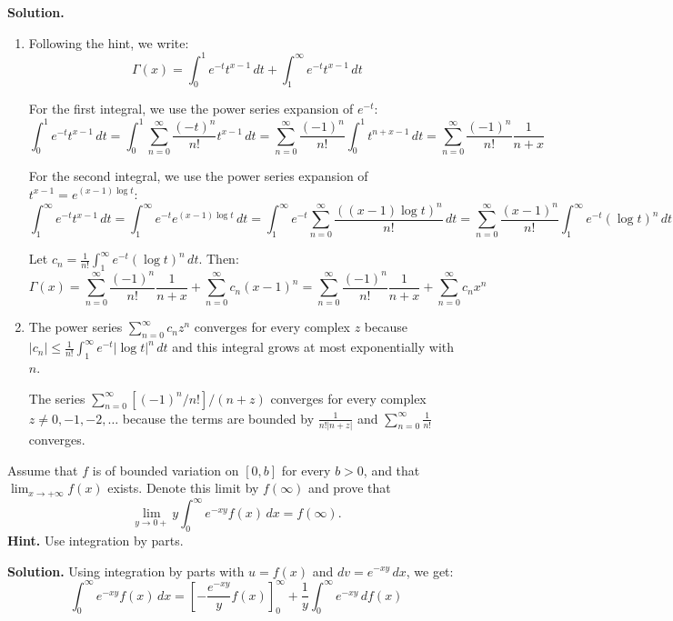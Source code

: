 \noindent\textbf{Solution.}
\begin{enumerate}[label=(\alph*)]
    \item Following the hint, we write:
    \[\Gamma(x) = \int_0^1 e^{-t} t^{x-1} \, dt + \int_1^\infty e^{-t} t^{x-1} \, dt\]
    
    For the first integral, we use the power series expansion of $e^{-t}$:
    \[\int_0^1 e^{-t} t^{x-1} \, dt = \int_0^1 \sum_{n=0}^{\infty} \frac{(-t)^n}{n!} t^{x-1} \, dt = \sum_{n=0}^{\infty} \frac{(-1)^n}{n!} \int_0^1 t^{n+x-1} \, dt = \sum_{n=0}^{\infty} \frac{(-1)^n}{n!} \frac{1}{n + x}\]
    
    For the second integral, we use the power series expansion of $t^{x-1} = e^{(x-1)\log t}$:
    \[\int_1^\infty e^{-t} t^{x-1} \, dt = \int_1^\infty e^{-t} e^{(x-1)\log t} \, dt = \int_1^\infty e^{-t} \sum_{n=0}^{\infty} \frac{((x-1)\log t)^n}{n!} \, dt = \sum_{n=0}^{\infty} \frac{(x-1)^n}{n!} \int_1^\infty e^{-t} (\log t)^n \, dt\]
    
    Let $c_n = \frac{1}{n!} \int_1^\infty e^{-t} (\log t)^n \, dt$. Then:
    \[\Gamma(x) = \sum_{n=0}^{\infty} \frac{(-1)^n}{n!} \frac{1}{n + x} + \sum_{n=0}^{\infty} c_n (x-1)^n = \sum_{n=0}^{\infty} \frac{(-1)^n}{n!} \frac{1}{n + x} + \sum_{n=0}^{\infty} c_n x^n\]
    
    \item The power series $\sum_{n=0}^{\infty} c_n z^n$ converges for every complex $z$ because $|c_n| \leq \frac{1}{n!} \int_1^\infty e^{-t} |\log t|^n \, dt$ and this integral grows at most exponentially with $n$.
    
    The series $\sum_{n=0}^{\infty} [(-1)^n / n!]/(n + z)$ converges for every complex $z \neq 0, -1, -2, \ldots$ because the terms are bounded by $\frac{1}{n! |n + z|}$ and $\sum_{n=0}^{\infty} \frac{1}{n!}$ converges.
\end{enumerate}

\begin{problembox}
Assume that $f$ is of bounded variation on $[0, b]$ for every $b > 0$, and that $\lim_{x \to +\infty} f(x)$ exists. Denote this limit by $f(\infty)$ and prove that
\[\lim_{y \to 0+} y \int_0^\infty e^{-xy}f(x) \, dx = f(\infty).\]
\textbf{Hint.} Use integration by parts.
\end{problembox}

\noindent\textbf{Solution.}
Using integration by parts with $u = f(x)$ and $dv = e^{-xy} \, dx$, we get:
\[\int_0^\infty e^{-xy}f(x) \, dx = \left[-\frac{e^{-xy}}{y} f(x)\right]_0^\infty + \frac{1}{y} \int_0^\infty e^{-xy} \, df(x)\]


